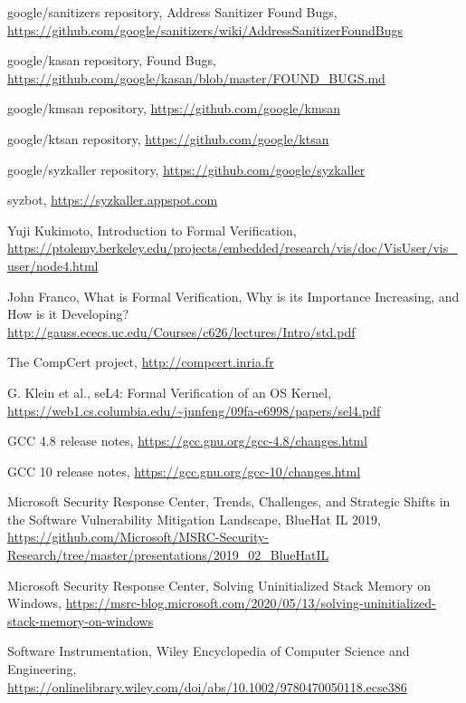 \documentclass[shortabstract, manyadvisors, english, mgr]{iithesis}
\theoremstyle{definition} \newtheorem*{definition}{Definicja}
\theoremstyle{definition} \newtheorem*{example}{Przykład}
\theoremstyle{definition} \newtheorem*{remark}{Uwaga}
\begin{document}
\begin{thebibliography}{99}
google/sanitizers repository,
Address Sanitizer Found Bugs,
\url{https://github.com/google/sanitizers/wiki/AddressSanitizerFoundBugs}

google/kasan repository,
Found Bugs,
\url{https://github.com/google/kasan/blob/master/FOUND_BUGS.md}

google/kmsan repository,
\url{https://github.com/google/kmsan}

google/ktsan repository,
\url{https://github.com/google/ktsan}

google/syzkaller repository,
\url{https://github.com/google/syzkaller}

syzbot,
\url{https://syzkaller.appspot.com}

Yuji Kukimoto,
Introduction to Formal Verification,
\url{https://ptolemy.berkeley.edu/projects/embedded/research/vis/doc/VisUser/vis_user/node4.html}

John Franco,
What is Formal Verification, Why is its Importance Increasing, and How is it Developing?
\url{http://gauss.ececs.uc.edu/Courses/c626/lectures/Intro/std.pdf}

The CompCert project,
\url{http://compcert.inria.fr}

G. Klein et al.,
seL4: Formal Verification of an OS Kernel,
\url{https://web1.cs.columbia.edu/~junfeng/09fa-e6998/papers/sel4.pdf}

GCC 4.8 release notes,
\url{https://gcc.gnu.org/gcc-4.8/changes.html}

GCC 10 release notes,
\url{https://gcc.gnu.org/gcc-10/changes.html}

Microsoft Security Response Center,
Trends, Challenges, and Strategic Shifts in the Software Vulnerability Mitigation Landscape, BlueHat IL 2019,
\url{https://github.com/Microsoft/MSRC-Security-Research/tree/master/presentations/2019_02_BlueHatIL}

Microsoft Security Response Center,
Solving Uninitialized Stack Memory on Windows,
\url{https://msrc-blog.microsoft.com/2020/05/13/solving-uninitialized-stack-memory-on-windows}

Software Instrumentation, Wiley Encyclopedia of Computer Science and Engineering,
\url{https://onlinelibrary.wiley.com/doi/abs/10.1002/9780470050118.ecse386}


\end{thebibliography}
\end{document}
